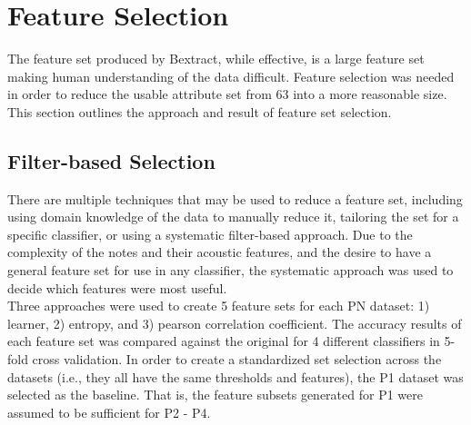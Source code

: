 \documentclass{article}
\begin{document}
\section{Feature Selection}
The feature set produced by Bextract, while effective, is a large feature set making human understanding of the data difficult. Feature selection was needed in order to reduce the usable attribute set from 63 into a more reasonable size. This section outlines the approach and result of feature set selection.
\subsection{Filter-based Selection}
There are multiple techniques that may be used to reduce a feature set, including using domain knowledge of the data to manually reduce it, tailoring the set for a specific classifier, or using a systematic filter-based approach\cite{hall1999correlation}. Due to the complexity of the notes and their acoustic features, and the desire to have a general feature set for use in any classifier, the systematic approach was used to decide which features were most useful.\\
Three approaches were used to create 5 feature sets for each PN dataset: 1) learner, 2) entropy, and 3) pearson correlation coefficient. The accuracy results of each feature set was compared against the original for 4 different classifiers in 5-fold cross validation. In order to create a standardized set selection across the datasets (i.e., they all have the same thresholds and features), the P1 dataset was selected as the baseline. That is, the feature subsets generated for P1 were assumed to be sufficient for P2 - P4.
\end{document}
